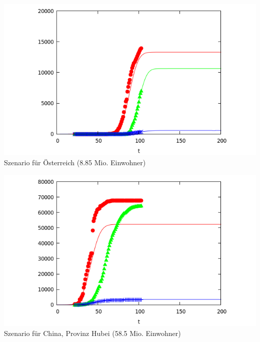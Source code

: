 \documentclass[a4paper,11pt]{article}
\begin{document}
\begin{center}
  \includegraphics[width=.8\textwidth]{Austria.png}\\[1em]
  {Szenario für Österreich (8.85 Mio. Einwohner)}
                  
  \includegraphics[width=.8\textwidth]{Hubei.png}\\[1em]
  {Szenario für China, Provinz Hubei (58.5 Mio. Einwohner)}
\end{center}
\end{document}
